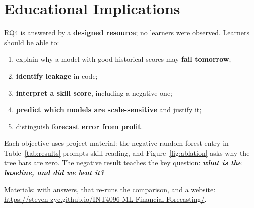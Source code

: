 \section{Educational Implications}
\label{sec:education}

RQ4 is answered by a \textbf{designed resource}; no learners were observed.
Learners should be able to:

\begin{enumerate}
  \item explain why a model with good historical scores may \textbf{fail
  tomorrow};
  \item \textbf{identify leakage} in code;
  \item \textbf{interpret a skill score}, including a negative one;
  \item \textbf{predict which models are scale-sensitive} and justify it;
  \item distinguish \textbf{forecast error from profit}.
\end{enumerate}

Each objective uses project material: the negative random-forest entry in
Table~\ref{tab:results} prompts skill reading, and Figure~\ref{fig:ablation} asks
why the tree bars are zero. The negative result teaches the key question:
\textbf{\emph{what is the baseline, and did we beat it?}}

Materials: 
with answers,
 that re-runs
the comparison, and a website:
\url{https://steven-zyc.github.io/INT4096-ML-Financial-Forecasting/}.
